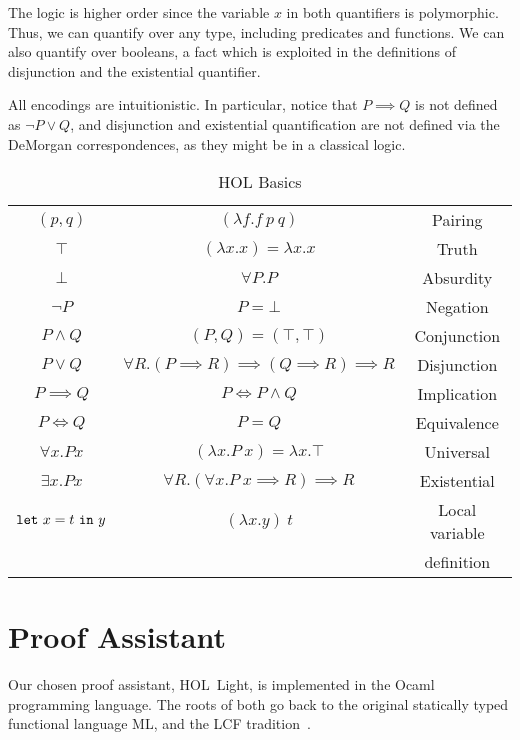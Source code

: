 The logic is higher order since the variable $x$ in both quantifiers is polymorphic. Thus, we can quantify over any type, including predicates and functions. We can also quantify over booleans, a fact which is exploited in the definitions of disjunction and the existential quantifier.

All encodings are intuitionistic. In particular, notice that \mbox{$P \implies Q$} is not defined as $\neg P \vee Q$, and disjunction and existential quantification are not defined via the DeMorgan correspondences, as they might be in a classical logic.

\begin{table}
\begin{center}
\begin{tabular}{|c|c|c|}
\hline
$(p,q)$          & $(\lambda f. f\ p\ q)$                & Pairing\\
$\top$           & $(\lambda x. x) = \lambda x. x$       & Truth\\
$\bot$           & $\forall P. P$                        & Absurdity\\
$\neg P$         & $P = \bot$                            & Negation\\
$P \wedge Q$     & $(P,Q) = (\top,\top)$                 & Conjunction\\
$P \vee Q$       & $\forall R. (P \implies R) \implies (Q \implies R) \implies R$  &Disjunction\\
$P \implies Q$   & $P \iff P \wedge Q$                   & Implication\\
$P \iff Q$       & $P = Q$                               & Equivalence\\
$\forall x. P x$ & $(\lambda x. P\ x) = \lambda x. \top$ & Universal\\
$\exists x. P x$ & $\forall R. (\forall x. P\ x \implies R) \implies R$ & Existential\\
$\code{let}\ x=t\ \code{in}\ y$ & $(\lambda x. y)\ t$ & Local variable\\
&& definition\\
\hline
\end{tabular}
\end{center}
\caption{HOL Basics}
\label{table:HOL}
\end{table}

\section{Proof Assistant}\label{sec:LCF}
Our chosen proof assistant, HOL~Light, is implemented in the Ocaml programming language. The roots of both go back to the original statically typed functional language ML, and the LCF tradition~\cite{LCF}.

